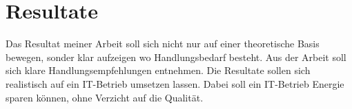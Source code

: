 \chapter{Resultate}

Das Resultat meiner Arbeit soll sich nicht nur auf einer theoretische Basis bewegen,
sonder klar aufzeigen wo Handlungsbedarf besteht. Aus der Arbeit soll sich klare
Handlungsempfehlungen entnehmen. Die Resultate sollen sich realistisch auf ein IT-Betrieb
umsetzen lassen. Dabei soll ein IT-Betrieb Energie sparen können, ohne Verzicht auf die Qualität.


